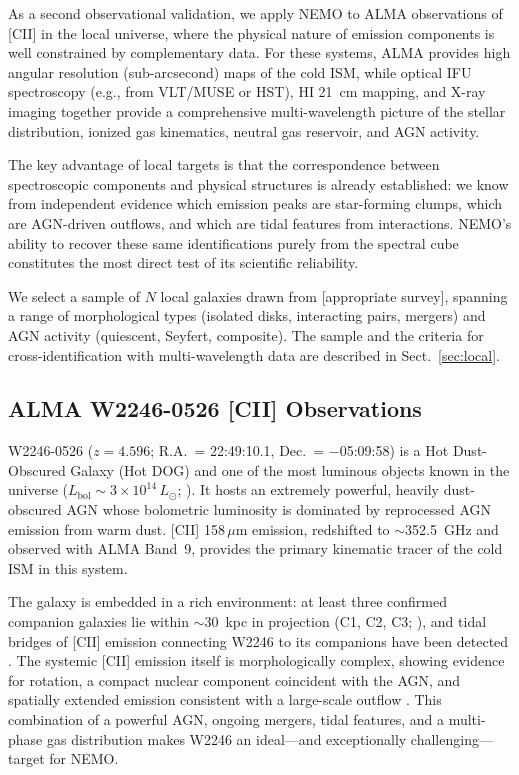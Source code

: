 \documentclass{aa}
\begin{document}
As a second observational validation, we apply NEMO to ALMA observations of [CII] in the local universe, where the physical nature of emission components is well constrained by complementary data. For these systems, ALMA provides high angular resolution (sub-arcsecond) maps of the cold ISM, while optical IFU spectroscopy (e.g., from VLT/MUSE or HST), HI 21~cm mapping, and X-ray imaging together provide a comprehensive multi-wavelength picture of the stellar distribution, ionized gas kinematics, neutral gas reservoir, and AGN activity.

The key advantage of local targets is that the correspondence between spectroscopic components and physical structures is already established: we know from independent evidence which emission peaks are star-forming clumps, which are AGN-driven outflows, and which are tidal features from interactions. NEMO's ability to recover these same identifications purely from the spectral cube constitutes the most direct test of its scientific reliability.

We select a sample of $N$ local galaxies drawn from [appropriate survey], spanning a range of morphological types (isolated disks, interacting pairs, mergers) and AGN activity (quiescent, Seyfert, composite). The sample and the criteria for cross-identification with multi-wavelength data are described in Sect.~\ref{sec:local}.

\subsection{ALMA W2246-0526 [CII] Observations}
\label{sec:data_w2246}

W2246-0526 ($z = 4.596$; R.A.\ = 22:49:10.1, Dec.\ = $-$05:09:58) is a Hot Dust-Obscured Galaxy (Hot DOG) \citep{Wu+2012} and one of the most luminous objects known in the universe ($L_\mathrm{bol} \sim 3 \times 10^{14}\,L_\odot$; \citealt{Tsai+2015}). It hosts an extremely powerful, heavily dust-obscured AGN whose bolometric luminosity is dominated by reprocessed AGN emission from warm dust. [CII] 158\,$\mu$m emission, redshifted to $\sim$352.5~GHz and observed with ALMA Band~9, provides the primary kinematic tracer of the cold ISM in this system.

The galaxy is embedded in a rich environment: at least three confirmed companion galaxies lie within $\sim$30~kpc in projection (C1, C2, C3; \citealt{DiazSantos+2018}), and tidal bridges of [CII] emission connecting W2246 to its companions have been detected \citep{DiazSantos+2018}. The systemic [CII] emission itself is morphologically complex, showing evidence for rotation, a compact nuclear component coincident with the AGN, and spatially extended emission consistent with a large-scale outflow \citep{...}. This combination of a powerful AGN, ongoing mergers, tidal features, and a multi-phase gas distribution makes W2246 an ideal---and exceptionally challenging---target for NEMO.
\end{document}
